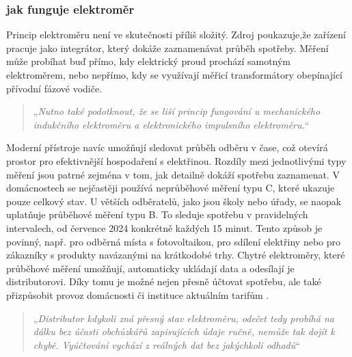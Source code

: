 \subsubsection{jak funguje elektroměr}
Princip elektroměru není ve skutečnosti příliš složitý. 
Zdroj \cite{CEZ2021} poukazuje,že zařízení pracuje jako integrátor, který dokáže zaznamenávat průběh spotřeby. Měření může probíhat buď přímo, kdy elektrický proud prochází samotným elektroměrem, nebo nepřímo, kdy se využívají měřicí transformátory obepínající přívodní fázové vodiče. 
\begin{quote}
„\textit{Nutno také podotknout, že se liší princip fungování u mechanického indukčního elektroměru a elektronického impulsního elektroměru.}“ \cite{CEZ2021}
\end{quote}
Moderní přístroje navíc umožňují sledovat průběh odběru v čase, což otevírá prostor pro efektivnější hospodaření s elektřinou. Rozdíly mezi jednotlivými typy měření jsou patrné zejména v tom, jak detailně dokáží spotřebu zaznamenat. V domácnostech se nejčastěji používá neprůběhové měření typu C, které ukazuje pouze celkový stav. 
U větších odběratelů, jako jsou školy nebo úřady, se naopak uplatňuje průběhové měření typu B. To sleduje spotřebu v pravidelných intervalech, od července 2024 konkrétně každých 15 minut. Tento způsob je povinný, např. pro odběrná místa  s fotovoltaikou, pro sdílení elektřiny nebo pro zákazníky s produkty navázanými na krátkodobé trhy. Chytré elektroměry, které průběhové měření umožňují, automaticky ukládají data a odesílají je distributorovi. Díky tomu je možné nejen přesně účtovat spotřebu, ale také přizpůsobit provoz domácnosti či instituce aktuálním tarifům \cite{Energie2025}.
\begin{quote}
„\textit{Distributor kdykoli zná přesný stav elektroměru, odečet tedy probíhá na dálku bez účasti obchůzkářů zapisujících údaje ručně, nemůže tak dojít k chybě. Vyúčtování vychází z reálných dat bez jakýchkoli odhadů}“ \cite{Energie2025}
\end{quote}
